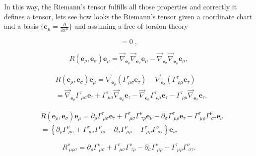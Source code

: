             In this way, the Riemann's tensor fulfills all those properties and correctly it defines a tensor, lets see how looks the Riemann's tensor given a coordinate chart and a basis $\{\mathbf{e}_{\mu}=\frac{\partial}{\partial x^{\mu}}\}$ and assuming a free of torsion theory

            \begin{equation}
                [\mathbf{e}_{\mu},\mathbf{e}_{\nu}]=0\;,
            \end{equation}

            \begin{equation}
                R(\mathbf{e}_{\rho},\mathbf{e}_{\sigma})\mathbf{e}_{\mu} = \Vec{\nabla}_{\mathbf{e}_{\rho}}\Vec{\nabla}_{\mathbf{e}_{\sigma}}\mathbf{e}_{\mu} - \Vec{\nabla}_{\mathbf{e}_{\sigma}}\Vec{\nabla}_{\mathbf{e}_{\rho}}\mathbf{e}_{\mu},
            \end{equation}

            \begin{align*}
                &R(\mathbf{e}_{\rho},\mathbf{e}_{\sigma})\mathbf{e}_{\mu} = \Vec{\nabla}_{\mathbf{e}_{\rho}}\left(\Gamma^{\tau}_{\;\mu\sigma} \mathbf{e}_{\tau}\right) - \Vec{\nabla}_{\mathbf{e}_{\sigma}}\left(\Gamma^{\tau}_{\;\rho\mu} \mathbf{e}_{\tau}\right)\\
                &= \Vec{\nabla}_{\mathbf{e}_{\rho}}\Gamma^{\tau}_{\;\mu\sigma}\mathbf{e}_{\tau} + \Gamma^{\tau}_{\;\mu\sigma}\Vec{\nabla}_{\mathbf{e}_{\rho}}\mathbf{e}_{\tau} - \Vec{\nabla}_{\mathbf{e}_{\sigma}}\Gamma^{\tau}_{\;\rho\mu}\mathbf{e}_{\tau}-\Gamma^{\tau}_{\;\rho\mu}\Vec{\nabla}_{\mathbf{e}_{\sigma}}\mathbf{e}_{\tau},
            \end{align*}

            \begin{align*}
                &R(\mathbf{e}_{\rho},\mathbf{e}_{\sigma}) \mathbf{e}_{\mu} = \partial_{\rho}\Gamma^{\tau}_{\;\mu\sigma}\mathbf{e}_{\tau} + \Gamma^{\tau}_{\;\mu\sigma}\Gamma^{\nu}_{\;\tau\rho}\mathbf{e}_{\nu} - \partial_{\sigma}\Gamma^{\tau}_{\;\mu\rho}\mathbf{e}_{\tau}-\Gamma^{\tau}_{\;\mu\rho}\Gamma^{\nu}_{\;\sigma\tau}\mathbf{e}_{\nu}\\
                &= \left\{\partial_{\rho}\Gamma^{\nu}_{\;\mu\sigma} + \Gamma^{\tau}_{\;\mu\sigma}\Gamma^{\nu}_{\;\tau\rho}-\partial_{\sigma}\Gamma^{\nu}_{\;\mu\rho} - \Gamma^{\tau}_{\;\mu\rho}\Gamma^{\nu}_{\;\sigma\tau} \right\}\mathbf{e}_{\nu},
            \end{align*}

            \begin{equation}
                R^{\nu}_{\;\mu\rho\sigma} = \partial_{\rho}\Gamma^{\nu}_{\;\mu\sigma} + \Gamma^{\tau}_{\;\mu\sigma}\Gamma^{\nu}_{\;\tau\rho}-\partial_{\sigma}\Gamma^{\nu}_{\;\mu\rho} - \Gamma^{\tau}_{\;\mu\rho}\Gamma^{\nu}_{\;\sigma\tau}.
            \end{equation}

